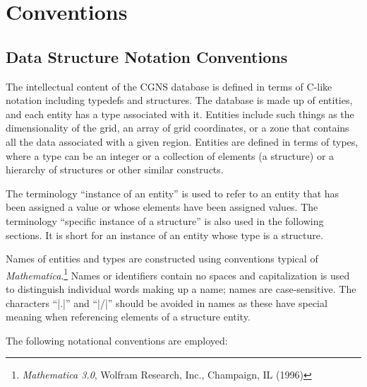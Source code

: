 \section{Conventions}
\label{s:conv}
\thispagestyle{plain}

\subsection{Data Structure Notation Conventions}
\label{s:conv_language}

The intellectual content of the CGNS database is defined in terms of
C-like notation including typedefs and structures.  The database is made
up of entities, and each entity has a type associated with it.  Entities
include such things as the dimensionality of the grid, an array of grid
coordinates, or a zone that contains all the data associated with a
given region.  Entities are defined in terms of types, where a type can
be an integer or a collection of elements (a structure) or a hierarchy
of structures or other similar constructs.

The terminology ``instance of an entity'' is used to refer to an entity
that has been assigned a value or whose elements have been assigned
values.  The terminology ``specific instance of a structure'' is also used
in the following sections.  It is short for an instance of an entity
whose type is a structure.

Names of entities and types are constructed using conventions typical
of \textit{Mathematica}.\footnote{\textit{Mathematica 3.0}, Wolfram Research,
Inc., Champaign, IL (1996)}
Names or identifiers contain no spaces and capitalization is used to
distinguish individual words making up a name; names are case-sensitive.
The characters ``|.|'' and ``|/|'' should be avoided in names as these have
special meaning when referencing elements of a structure entity.

The following notational conventions are employed:

